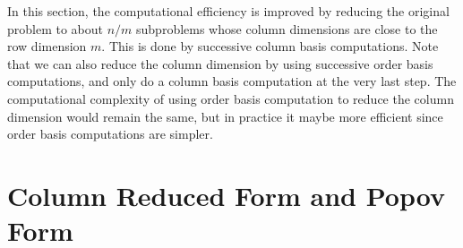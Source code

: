 \begin{rem}
In this section, the computational efficiency is improved by reducing
the original problem to about $n/m$ subproblems whose column dimensions
are close to the row dimension $m$. This is done by successive column
basis computations. Note that we can also reduce the column dimension
by using successive order basis computations, and only do a column
basis computation at the very last step. The computational complexity
of using order basis computation to reduce the column dimension would
remain the same, but in practice it maybe more efficient since order
basis computations are simpler. 
\end{rem}

\section{Column Reduced Form and Popov Form}

